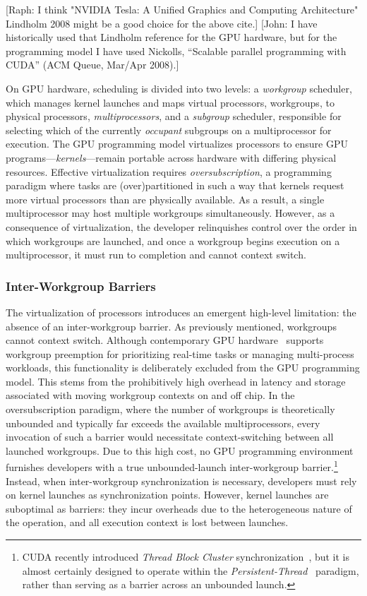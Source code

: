 \documentclass[sigconf]{acmart}
\newcommand{\john}[1]{{\footnotesize\color{cyan}[John: #1]}}
\newcommand{\raph}[1]{{\footnotesize\color{magenta}[Raph: #1]}}
\begin{document}
\raph{I think "NVIDIA Tesla: A Unified Graphics and Computing Architecture" Lindholm 2008 might be a good choice for the above cite.}
\john{I have historically used that Lindholm reference for the GPU hardware, but for the programming model I have used Nickolls, ``Scalable parallel programming with CUDA'' (ACM Queue, Mar/Apr 2008).}

On GPU hardware, scheduling is divided into two levels: a \emph{workgroup} scheduler, which manages kernel launches and maps virtual processors, workgroups, to physical processors, \emph{multiprocessors}, and a \emph{subgroup} scheduler, responsible for selecting which of the currently \emph{occupant} subgroups on a multiprocessor for execution. The GPU programming model virtualizes processors to ensure GPU programs---\emph{kernels}---remain portable across hardware with differing physical resources. Effective virtualization requires \emph{oversubscription}, a programming paradigm where tasks are (over)partitioned in such a way that kernels request more virtual processors than are physically available. As a result, a single multiprocessor may host multiple workgroups simultaneously. However, as a consequence of virtualization, the developer relinquishes control over the order in which workgroups are launched, and once a workgroup begins execution on a multiprocessor, it must run to completion and cannot context switch.

\subsubsection{Inter-Workgroup Barriers}
The virtualization of processors introduces an emergent high-level limitation: the absence of an inter-workgroup barrier. As previously mentioned, workgroups cannot context switch. Although contemporary GPU hardware~\cite{} supports workgroup preemption for prioritizing real-time tasks or managing multi-process workloads, this functionality is deliberately excluded from the GPU programming model. This stems from the prohibitively high overhead in latency and storage associated with moving workgroup contexts on and off chip. In the oversubscription paradigm, where the number of workgroups is theoretically unbounded and typically far exceeds the available multiprocessors, every invocation of such a barrier would necessitate context-switching between all launched workgroups. Due to this high cost, no GPU programming environment furnishes developers with a true unbounded-launch inter-workgroup barrier.\footnote{CUDA recently introduced \emph{Thread Block Cluster} synchronization~\cite{NvidiaCudaGuide}, but it is almost certainly designed to operate within the \emph{Persistent-Thread}~\cite{gupta2012} paradigm, rather than serving as a barrier across an unbounded launch.} Instead, when inter-workgroup synchronization is necessary, developers must rely on kernel launches as synchronization points. However, kernel launches are suboptimal as barriers: they incur overheads due to the heterogeneous nature of the operation, and all execution context is lost between launches.
\end{document}
